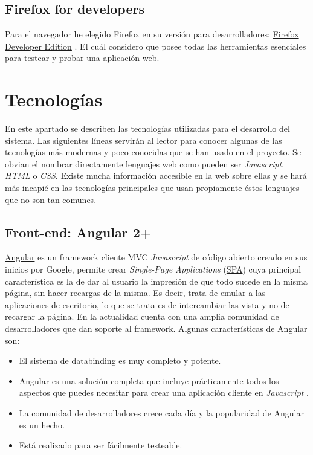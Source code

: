 \subsection{Firefox for developers}\label{herramientas_firefox}
Para el navegador he elegido Firefox en su versión para desarrolladores: \hyperlink{https://www.mozilla.org/es-ES/firefox/developer}{Firefox Developer Edition} . El cuál considero que posee todas las herramientas esenciales para testear y probar una aplicación web.


\section{Tecnologías}\label{tecnologias}
 En este apartado se describen las tecnologías utilizadas para el desarrollo del sistema. Las siguientes líneas servirán al lector para conocer algunas de las tecnologías más modernas y poco conocidas que se han usado en el proyecto. Se obvian el nombrar directamente lenguajes web como pueden ser \emph{Javascript}, \emph{HTML} o \emph{CSS}. Existe mucha información accesible en la web sobre ellas y se hará más incapié en las tecnologías principales que usan propiamente éstos lenguajes que no son tan comunes.
 
 \subsection{Front-end: Angular 2+}\label{tecnologias_angular}
 \hyperlink{https://angular.io}{Angular} es un framework cliente MVC \emph{Javascript} de código abierto creado en sus inicios por Google, permite crear  \emph{Single-Page Applications} (\hyperlink{https://es.wikipedia.org/wiki/Single-page_application}{SPA})  cuya principal característica es la de dar al usuario la impresión de que todo sucede en la misma página, sin hacer recargas de la misma. Es decir, trata de emular a las aplicaciones de escritorio, lo que se trata es de intercambiar las vista y no de recargar la página. En la actualidad cuenta con una amplia comunidad de desarrolladores  que dan soporte al framework.  Algunas características de Angular son:
 
\begin{itemize}
\tightlist
\item
  El sistema de databinding es muy completo y potente.
\item
  Angular es una solución completa que incluye prácticamente todos los aspectos que puedes necesitar para crear una aplicación cliente en \emph{Javascript} . 
\item
  La comunidad de desarrolladores crece cada día y la popularidad de Angular es un hecho.
  \item
  Está realizado para ser fácilmente testeable.
\end{itemize}
 
